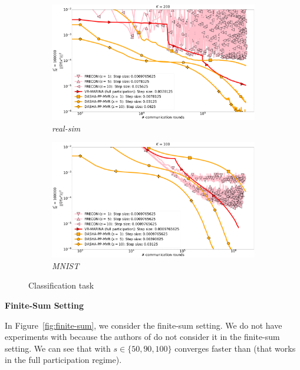 \documentclass[12pt]{article}
\begin{document}
\begin{figure}[H]
    \begin{subfigure}{.5\textwidth}
        \includegraphics[width=\textwidth]{tmp_launch/neurips_2022_stochastic_real-sim_nof_200_numnodes_10_probs_mega_batch_100000_fix_nm_bug.pdf}
        \caption{\textit{real-sim}}
    \end{subfigure}
    \begin{subfigure}{.5\textwidth}
        \includegraphics[width=\textwidth]{tmp_launch/neurips_2023_stochastic_mnist_nof_100_numnodes_10_probs_mega_batch_100000_batch_size_10_longer.pdf}
        \caption{\textit{MNIST}}
    \end{subfigure}
\caption{Classification task}
\label{fig:stochastic}
\end{figure}

\begin{center}
    \bf Finite-Sum Setting
\end{center}
In Figure~\ref{fig:finite-sum}, we consider the finite-sum setting. We do not have experiments with  because the authors of  do not consider it in the finite-sum setting. We can see that  with $s \in \{50, 90, 100\}$ converges faster than  (that works in the full participation regime).
\end{document}
